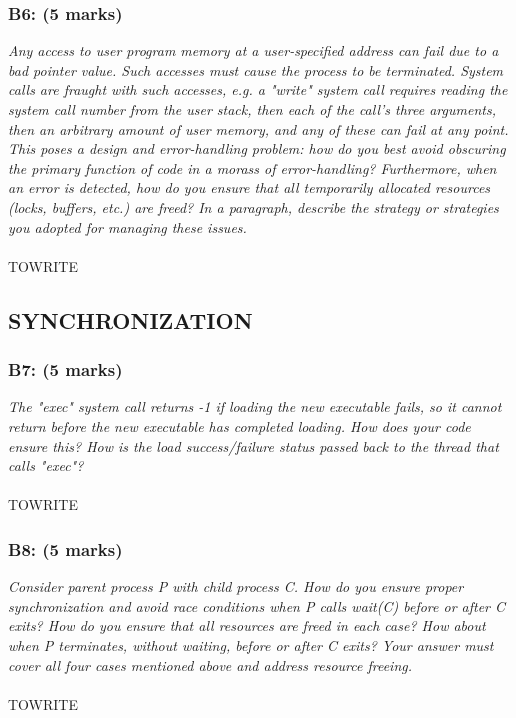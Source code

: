 \documentclass[a4paper,12pt]{article}
\begin{document}
\subsubsection*{B6: (5 marks) }
\textit{Any access to user program memory at a user-specified address can fail due to
a bad pointer value. Such accesses must cause the process to be terminated.
System calls are fraught with such accesses, e.g. a "write" system call
requires reading the system call number from the user stack, then each of the
call's three arguments, then an arbitrary amount of user memory, and any of
these can fail at any point. This poses a design and error-handling problem:
how do you best avoid obscuring the primary function of code in a morass of
error-handling? Furthermore, when an error is detected, how do you ensure
that all temporarily allocated resources (locks, buffers, etc.) are freed?
In a paragraph, describe the strategy or strategies you adopted for managing
these issues.}
\\ \\TOWRITE

\subsection{SYNCHRONIZATION}

\subsubsection*{B7: (5 marks) }
\textit{The "exec" system call returns -1 if loading the new executable fails, so it
cannot return before the new executable has completed loading. How does your
code ensure this? How is the load success/failure status passed back to the
thread that calls "exec"?}
\\ \\TOWRITE

\subsubsection*{B8: (5 marks) }
\textit{Consider parent process P with child process C. How do you ensure proper
synchronization and avoid race conditions when P calls wait(C) before or
after C exits? How do you ensure that all resources are freed in each case?
How about when P terminates, without waiting, before or after C exits? Your
answer must cover all four cases mentioned above and address resource freeing.}
\\ \\TOWRITE
\end{document}
